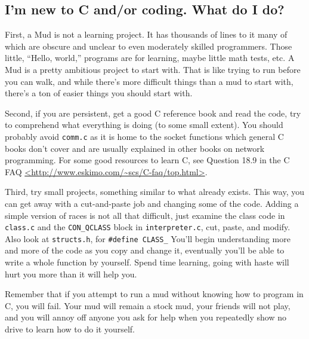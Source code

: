 \documentclass[11pt]{article}
\begin{document}
\subsection{I'm new to C and/or coding. What do I do?}
First, a Mud is not a learning project. It has thousands of lines to it many of which are obscure and unclear to even moderately skilled programmers. Those little, ``Hello, world,'' programs are for learning, maybe little math tests, etc. A Mud is a pretty ambitious project to start with. That is like trying to run before you can walk, and while there's more difficult things than a mud to start with, there's a ton of easier things you should start with.
\par
Second, if you are persistent, get a good C reference book and read the code, try to comprehend what everything is doing (to some small extent). You should probably avoid \texttt{comm.c} as it is home to the socket functions which general C books don't cover and are usually explained in other books on network programming.
For some good resources to learn C, see Question 18.9 in the C FAQ \url{<http://www.eskimo.com/~scs/C-faq/top.html>}.
\par
Third, try small projects, something similar to what already exists. This way, you can get away with a cut-and-paste job and changing some of the code. Adding a simple version of races is not all that difficult, just examine the class code in \texttt{class.c} and the \texttt{CON\_QCLASS} block in \texttt{interpreter.c}, cut, paste, and modify. Also look at \texttt{structs.h}, for \texttt{\#define CLASS\_} You'll begin understanding more and more of the code as you copy and change it, eventually you'll be able to write a whole function by yourself. Spend time learning, going with haste will hurt you more than it will help you.
\par
Remember that if you attempt to run a mud without knowing how to program in C, you will fail.  Your mud will remain a stock mud, your friends will not play, and you will annoy off anyone you ask for help when you repeatedly show no drive to learn how to do it yourself.
\end{document}
